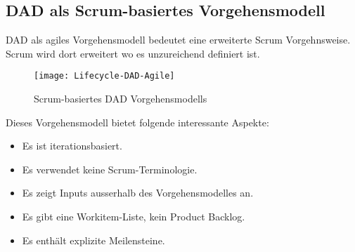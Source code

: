 \subsection{DAD als Scrum-basiertes Vorgehensmodell}

DAD als agiles Vorgehensmodell bedeutet eine erweiterte Scrum Vorgehnsweise. Scrum wird dort erweitert wo es unzureichend definiert ist.


\begin{figure}[H]
	\centering
	\texttt{[image: Lifecycle-DAD-Agile]}
	\caption{Scrum-basiertes DAD Vorgehensmodells}
	\label{fig:lifecycle}
\end{figure}\medskip


Dieses Vorgehensmodell bietet folgende interessante Aspekte:
\begin{itemize}
	\item Es ist iterationsbasiert.
	\item Es verwendet keine Scrum-Terminologie.
	\item Es zeigt Inputs ausserhalb des Vorgehensmodelles an.
	\item Es gibt eine Workitem-Liste, kein Product Backlog.
	\item Es enthält explizite Meilensteine.
\end{itemize}
